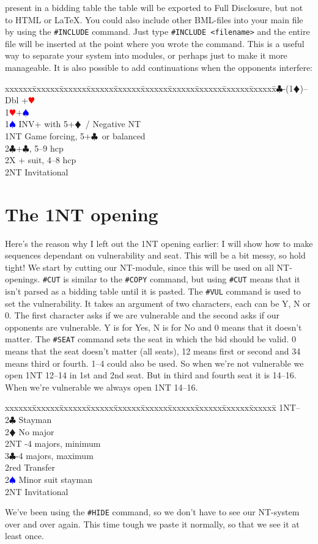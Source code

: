 \documentclass[a4paper]{article}
\newcommand{\BC}{\textcolor{OliveGreen}{$\clubsuit$}}
\newcommand{\BD}{\textcolor{RedOrange}{$\vardiamondsuit$}}
\newcommand{\BH}{\textcolor{Red}{$\varheartsuit${}}}
\newcommand{\BS}{\textcolor{Blue}{$\spadesuit${}}}
\newenvironment{bidtable}
{\begin{tabbing}

xxxxxx\=xxxxxx\=xxxxxx\=xxxxxx\=xxxxxx\=xxxxxx\=xxxxxx\=xxxxxx\=xxxxxx\=xxxxxx\=\kill}
{\end{tabbing} }%
\begin{document}
present in a bidding table the table will be exported to Full
Disclosure, but not to HTML or LaTeX.
\bigbreak
You could also include other BML-files into your main file by using
the \texttt{\#INCLUDE} command. Just type \texttt{\#INCLUDE <filename>} and the entire
file will be inserted at the point where you wrote the command. This
is a useful way to separate your system into modules, or perhaps
just to make it more manageable.
\bigbreak
It is also possible to add continuations when the opponents
interfere:
\bigbreak
\begin{bidtable}
1\BC-(1\BD)--\+\\
Dbl +\BH \\
1\BH {}+\BS \\
1\BS \> INV+ with 5+\BD\ / Negative NT\\
1NT \> Game forcing, 5+\BC\ or balanced\\
2\BC {}+\BC , 5--9 hcp\\
2X + suit, 4--8 hcp\\
2NT \> Invitational\-
\end{bidtable}
\bigbreak
\section{The 1NT opening}

Here's the reason why I left out the 1NT opening earlier: I will
show how to make sequences dependant on vulnerability and
seat. This will be a bit messy, so hold tight!
\bigbreak
We start by cutting our NT-module, since this will be used on all
NT-openings. \texttt{\#CUT} is similar to the \texttt{\#COPY} command, but using \texttt{\#CUT}
means that it isn't parsed as a bidding table until it is pasted.
\bigbreak
The \texttt{\#VUL} command is used to set the vulnerability. It takes an
argument of two characters, each can be Y, N or 0. The first
character asks if we are vulnerable and the second asks if our
opponents are vulnerable. Y is for Yes, N is for No and 0 means that
it doesn't matter.
\bigbreak
The \texttt{\#SEAT} command sets the seat in which the bid should be valid. 0
means that the seat doesn't matter (all seats), 12 means first or
second and 34 means third or fourth. 1--4 could also be used.
\bigbreak
So when we're not vulnerable we open 1NT 12--14 in 1st and 2nd seat.
\bigbreak
But in third and fourth seat it is 14--16.
\bigbreak
When we're vulnerable we always open 1NT 14--16.
\bigbreak
\begin{bidtable}
1NT--\+\\
2\BC \> Stayman\+\\
2\BD \> No major\\
2NT -4 majors, minimum\\
3\BC {}-4 majors, maximum\-\\
2red \> Transfer\\
2\BS \> Minor suit stayman\\
2NT \> Invitational\-
\end{bidtable}
\bigbreak
We've been using the \texttt{\#HIDE} command, so we don't have to see our
NT-system over and over again. This time tough we paste it
normally, so that we see it at least once.
\bigbreak
\end{document}
